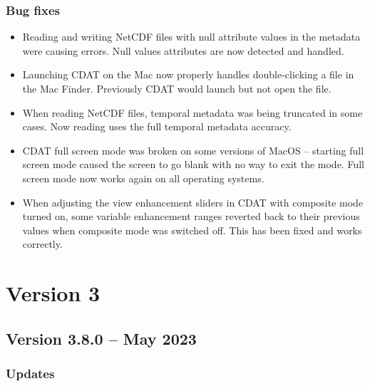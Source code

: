 \subsubsection*{ Bug fixes}
\begin{itemize}

\item Reading and writing NetCDF files with null attribute values in the
metadata were causing errors.  Null values attributes are now detected
and handled.

\item Launching CDAT on the Mac now properly handles double-clicking 
a file in the Mac Finder.  Previously CDAT would launch but not 
open the file.

\item When reading NetCDF files, temporal metadata was being truncated in 
some cases.  Now reading uses the full temporal metadata accuracy.

\item CDAT full screen mode was broken on some versions of MacOS -- starting 
full screen mode caused the screen to go blank with no way to exit the mode.
Full screen mode now works again on all operating systems.

\item When adjusting the view enhancement sliders in CDAT with composite mode
turned on, some variable enhancement ranges reverted back to their previous 
values when composite mode was switched off.  This has been fixed and works 
correctly.

\end{itemize}


\section{Version 3}


\subsection*{Version 3.8.0 -- May 2023}

\subsubsection*{ Updates}

